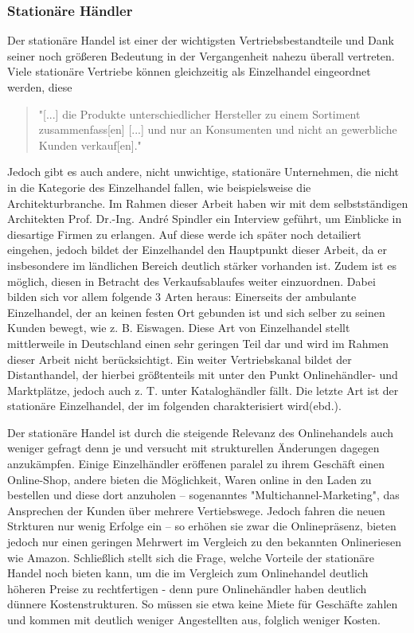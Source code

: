 \begin{folding} \subsubsection{Stationäre Händler}
Der stationäre Handel ist einer der wichtigsten Vertriebsbestandteile und Dank seiner noch größeren Bedeutung in der Vergangenheit nahezu überall vertreten. Viele stationäre Vertriebe können gleichzeitig als Einzelhandel eingeordnet werden, diese
\begin{quote}
    "[...] die Produkte unterschiedlicher Hersteller zu einem Sortiment zusammenfass[en] [...] und nur an Konsumenten und nicht an gewerbliche Kunden verkauf[en]."\cite[S. 20]{Ebert}
\end{quote}
Jedoch gibt es auch andere, nicht unwichtige, stationäre Unternehmen, die nicht in die Kategorie des Einzelhandel fallen, wie beispielsweise die Architekturbranche. Im Rahmen dieser Arbeit haben wir mit dem selbstständigen Architekten Prof. Dr.-Ing. André Spindler ein Interview geführt, um Einblicke in diesartige Firmen zu erlangen. Auf diese werde ich später noch detailiert eingehen, jedoch bildet der Einzelhandel den Hauptpunkt dieser Arbeit, da er insbesondere im ländlichen Bereich deutlich stärker vorhanden ist. Zudem ist es möglich, diesen in Betracht des Verkaufsablaufes weiter einzuordnen. Dabei bilden sich vor allem folgende 3 Arten heraus: Einerseits der ambulante Einzelhandel, der an keinen festen Ort gebunden ist und sich selber zu seinen Kunden bewegt, wie z. B. Eiswagen. Diese Art von Einzelhandel stellt mittlerweile in Deutschland einen sehr geringen Teil dar und wird im Rahmen dieser Arbeit nicht berücksichtigt. Ein weiter Vertriebskanal bildet der Distanthandel, der hierbei größtenteils mit unter den Punkt Onlinehändler- und Marktplätze, jedoch auch z. T. unter Kataloghändler fällt. Die letzte Art ist der stationäre Einzelhandel, der im folgenden charakterisiert wird(ebd.).

Der stationäre Handel ist durch die steigende Relevanz des Onlinehandels auch weniger gefragt denn je und versucht mit strukturellen Änderungen dagegen anzukämpfen. Einige Einzelhändler eröffenen paralel zu ihrem Geschäft einen Online-Shop, andere bieten die Möglichkeit, Waren online in den Laden zu bestellen und diese dort anzuholen – sogenanntes "Multichannel-Marketing", das Ansprechen der Kunden über mehrere Vertiebswege\cite[S. 34f]{Graf}. Jedoch fahren die neuen Strkturen nur wenig Erfolge ein – so erhöhen sie zwar die Onlinepräsenz, bieten jedoch nur einen geringen Mehrwert im Vergleich zu den bekannten Onlineriesen wie Amazon\cite[S. 34f]{Graf}. 
Schließlich stellt sich die Frage, welche Vorteile der stationäre Handel noch bieten kann, um die im Vergleich zum Onlinehandel deutlich höheren Preise zu rechtfertigen - denn pure Onlinehändler haben deutlich dünnere Kostenstrukturen\cite[S. 14]{evilcom}. So müssen sie etwa keine Miete für Geschäfte zahlen und kommen mit deutlich weniger Angestellten aus, folglich weniger Kosten.


\end{folding}

